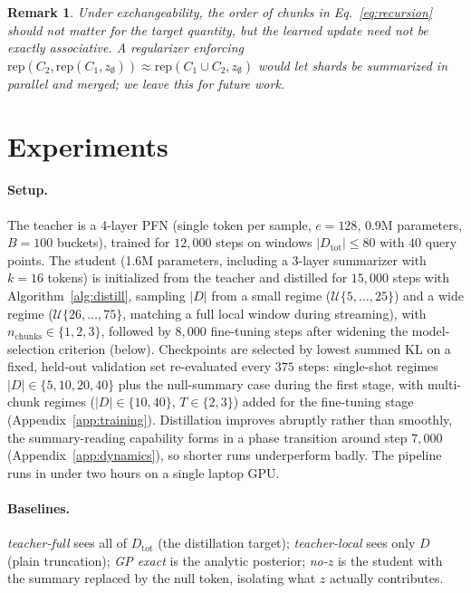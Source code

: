 \documentclass{article}
\newcommand{\Dtot}{D_{\mathrm{tot}}}
\newcommand{\Dloc}{D}
\newcommand{\rep}{\mathrm{rep}}
\newtheorem{remark}{Remark}
\begin{document}
\begin{remark}
Under exchangeability, the order of chunks in Eq.~\eqref{eq:recursion}
should not matter for the target quantity, but the learned update need not
be exactly associative. A regularizer enforcing
$\rep(C_2, \rep(C_1, z_\emptyset)) \approx \rep(C_1 \cup C_2, z_\emptyset)$
would let shards be summarized in parallel and merged; we leave this for
future work.
\end{remark}

\section{Experiments}
\label{sec:exp}

\paragraph{Setup.} The teacher is a 4-layer PFN (single token per
sample, $e=128$, $0.9$M parameters, $B=100$ buckets), trained for
$12{,}000$ steps on windows $|\Dtot| \le 80$ with $40$ query points. The
student (1.6M parameters, including a 3-layer summarizer with $k=16$
tokens) is initialized from the teacher and distilled for $15{,}000$ steps
with Algorithm~\ref{alg:distill}, sampling $|\Dloc|$ from a small regime
($\mathcal{U}\{5,\dots,25\}$) and a wide regime
($\mathcal{U}\{26,\dots,75\}$, matching a full local window during
streaming), with $n_{\mathrm{chunks}} \in \{1,2,3\}$, followed by
$8{,}000$ fine-tuning steps after widening the model-selection criterion
(below). Checkpoints are selected by lowest summed KL on a fixed, held-out
validation set re-evaluated every $375$ steps: single-shot regimes
$|\Dloc| \in \{5,10,20,40\}$ plus the null-summary case during the first
stage, with multi-chunk regimes ($|\Dloc| \in \{10,40\}$,
$T \in \{2,3\}$) added for the fine-tuning stage
(Appendix~\ref{app:training}). Distillation improves abruptly
rather than smoothly, the summary-reading capability forms in a phase
transition around step $7{,}000$ (Appendix~\ref{app:dynamics}), so
shorter runs underperform badly. The pipeline runs in under two hours on a
single laptop GPU.

\paragraph{Baselines.} \emph{teacher-full} sees all of $\Dtot$ (the
distillation target); \emph{teacher-local} sees only $\Dloc$ (plain
truncation); \emph{GP exact} is the analytic posterior; \emph{no-$z$} is
the student with the summary replaced by the null token, isolating what
$z$ actually contributes.
\end{document}
